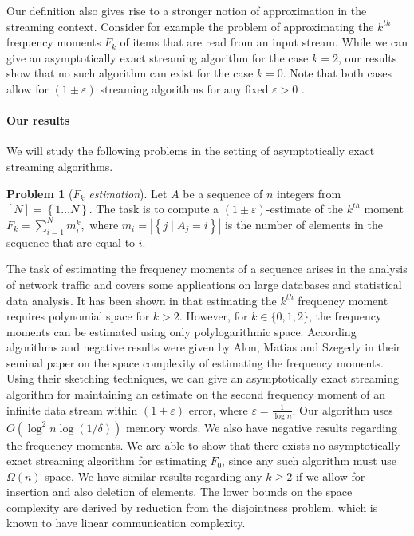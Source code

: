 \documentclass[a4paper,11pt,oneside,english,onecolumn]{article}
\theoremstyle{definition}
\newtheorem{problem}{Problem}
\newcommand{\br}[1]{\left\{#1\right\}}                            \renewcommand{\Pr}[1]{\ensuremath{\mathbf{Pr}\left[#1\right]}}
\newcommand{\eps}{\ensuremath{\varepsilon}}
\begin{document}
Our definition also gives rise to a stronger notion of approximation in the streaming context. Consider for example the problem of approximating the $k^{th}$ frequency moments $F_k$ of items that are read from an input stream. While we can give an asymptotically exact streaming algorithm for the case $k=2$, our results show that no such algorithm can exist for the case $k=0$. Note that both cases allow for $(1\pm\eps)$ streaming algorithms for any fixed $\eps>0$ \cite{ApproxFreqMom,Bar-YossefJKST02}.

\paragraph*{Our results}

We will study the following problems in the setting of asymptotically exact streaming algorithms.

\begin{problem}[\emph{$F_k$ estimation}] Let $A$ be a sequence of $n$ integers from $[N]=\br{1 \ldots N}$. The task is to compute a $(1 \pm \eps)$-estimate of the $k^{th}$ moment $F_k=\sum_{i=1}^N m_i^k, \text{ where }  m_i = | \br{j \mid A_j =i} |$
is the number of elements in the sequence that are equal to $i$.
\end{problem}

The task of estimating the frequency moments of a sequence arises in the analysis of network traffic and covers some applications on large databases and statistical data analysis. It has been shown in \cite{ImpFreqLowBound} that estimating the $k^{th}$ frequency moment requires polynomial space for $k > 2$. However, for $k\in\{0,1,2\}$, the frequency moments can be estimated using only polylogarithmic space. According algorithms and negative results were given by Alon, Matias and Szegedy in their seminal paper \cite{ApproxFreqMom} on the space complexity of estimating the frequency moments.
Using their sketching techniques, we can give an asymptotically exact streaming algorithm for maintaining an estimate on the second frequency moment of an infinite data stream within $(1\pm\eps)$ error, where $\eps=\frac{1}{\log n}$. Our algorithm uses $O(\log^2 n \log(1/\delta))$ memory words.
We also have negative results regarding the frequency moments. We are able to show that there exists no asymptotically exact streaming algorithm for estimating $F_0$, since any such algorithm must use $\Omega(n)$ space. We have similar results regarding any $k\geq 2$ if we allow for insertion and also deletion of elements.
The lower bounds on the space complexity are derived by reduction from the disjointness problem, which is known to have linear communication complexity.
\end{document}
